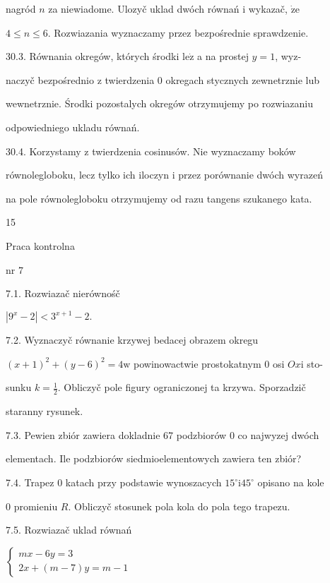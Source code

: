 \documentclass[a4paper,12pt]{article}
\begin{document}
nagród $n$ za niewiadome. Ulozyč uklad dwóch równań $\mathrm{i}$ wykazač, $\dot{\mathrm{z}}\mathrm{e}$

$4\leq n\leq 6$. Rozwiazania wyznaczamy przez bezpośrednie sprawdzenie.

30.3. Równania okregów, których środki $\mathrm{l}\mathrm{e}\dot{\mathrm{z}}$ a na prostej $y = 1$, wyz-

naczyč bezpośrednio $\mathrm{z}$ twierdzenia $0$ okregach stycznych zewnetrznie lub

wewnetrznie. Środki pozostalych okregów otrzymujemy po rozwiazaniu

odpowiedniego ukladu równań.

30.4. Korzystamy $\mathrm{z}$ twierdzenia cosinusów. Nie wyznaczamy boków

równolegloboku, lecz tylko ich iloczyn $\mathrm{i}$ przez porównanie dwóch wyrazeń

na pole równolegloboku otrzymujemy od razu tangens szukanego kata.





15

Praca kontrolna

nr 7

7.1. Rozwiazač nierównośč

$|9^{x}-2|<3^{x+1}-2.$

7.2. Wyznaczyč równanie krzywej bedacej obrazem okregu

$(x+1)^{2}+(y-6)^{2}=4\mathrm{w}$ powinowactwie prostokatnym $0$ osi $Ox\mathrm{i}$ sto-

sunku $k=\displaystyle \frac{1}{2}$. Obliczyč pole figury ograniczonej ta krzywa. Sporzadzič

staranny rysunek.

7.3. Pewien zbiór zawiera dokladnie 67 podzbiorów $0$ co najwyzej dwóch

elementach. Ile podzbiorów siedmioelementowych zawiera ten zbiór?

7.4. Trapez $0$ katach przy podstawie wynoszacych $15^{\circ}\mathrm{i}45^{\circ}$ opisano na kole

$0$ promieniu $R$. Obliczyč stosunek pola kola do pola tego trapezu.

7.5. Rozwiazač uklad równań

$\left\{\begin{array}{l}
mx-6y=3\\
2x+(m-7)y=m-1
\end{array}\right.$
\end{document}
